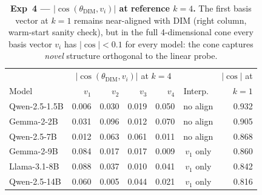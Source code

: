 \begin{table}[t]
\centering
\caption{%
\textbf{Exp~4 — $|\cos(\theta_{\text{DIM}}, v_i)|$ at reference $k=4$.}
The first basis vector at $k{=}1$ remains near-aligned with DIM (right column,
warm-start sanity check), but in the full 4-dimensional cone every basis vector
$v_i$ has $|\cos|<0.1$ for every model: the cone captures \emph{novel}
structure orthogonal to the linear probe.}
\label{tab:orthogonality}
\small
\setlength{\tabcolsep}{4pt}
\begin{tabular}{l rrrr c r}
\toprule
& \multicolumn{4}{c}{$|\cos(\theta_{\text{DIM}}, v_i)|$ at $k=4$} & & $|\cos|$ at \\
Model & $v_1$ & $v_2$ & $v_3$ & $v_4$ & Interp.\ & $k=1$ \\
\midrule
Qwen-2.5-1.5B & 0.006 & 0.030 & 0.019 & 0.050 & no align       & 0.932 \\
Gemma-2-2B    & 0.031 & 0.096 & 0.012 & 0.070 & no align       & 0.905 \\
Qwen-2.5-7B   & 0.012 & 0.063 & 0.061 & 0.011 & no align       & 0.868 \\
Gemma-2-9B    & 0.084 & 0.017 & 0.017 & 0.009 & $v_1$ only     & 0.860 \\
Llama-3.1-8B  & 0.088 & 0.037 & 0.010 & 0.041 & $v_1$ only     & 0.842 \\
Qwen-2.5-14B  & 0.060 & 0.005 & 0.044 & 0.021 & $v_1$ only     & 0.816 \\
\bottomrule
\end{tabular}
\end{table}


